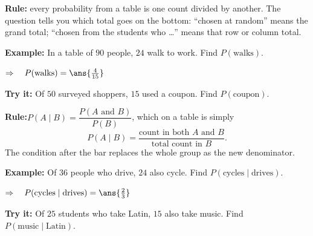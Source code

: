 \documentclass[12pt]{article}
\begin{document}


\begin{formulabox}
\textbf{Rule:} every probability from a table is one count divided by another.
The question tells you which total goes on the bottom: ``chosen at random'' means the
grand total; ``chosen from the students who \dots'' means that row or column total.
\end{formulabox}

\begin{examplebox}
\textbf{Example:} \quad In a table of $90$ people, $24$ walk to work. Find $P(\text{walks})$.

$\Rightarrow\quad P(\text{walks}) = \ans{\tfrac{4}{15}}$
\end{examplebox}

\begin{tryitbox}
\textbf{Try it:} \quad Of $50$ surveyed shoppers, $15$ used a coupon. Find $P(\text{coupon})$.\\[2pt]
\end{tryitbox}


\begin{formulabox}
\textbf{Rule:}\quad $P(A \mid B) = \dfrac{P(A \text{ and } B)}{P(B)}$, which on a table is simply
\[ P(A \mid B) = \frac{\text{count in both } A \text{ and } B}{\text{total count in } B}. \]
The condition after the bar replaces the whole group as the new denominator.
\end{formulabox}

\begin{examplebox}
\textbf{Example:} \quad Of $36$ people who drive, $24$ also cycle. Find $P(\text{cycles} \mid \text{drives})$.

$\Rightarrow\quad P(\text{cycles} \mid \text{drives}) = \ans{\tfrac{2}{3}}$
\end{examplebox}

\begin{tryitbox}
\textbf{Try it:} \quad Of $25$ students who take Latin, $15$ also take music. Find $P(\text{music} \mid \text{Latin})$.\\[2pt]
\end{tryitbox}
\end{document}
